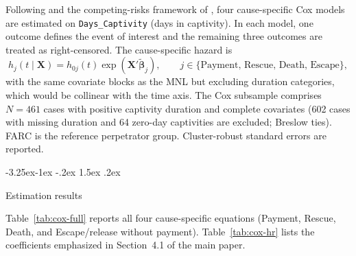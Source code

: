 \documentclass[12pt]{article}
\makeatletter
\numberwithin{equation}{section}
\numberwithin{table}{section}
\renewcommand\subsection{\@startsection{subsection}{2}{\z@}%
                                     {-3.25ex\@plus -1ex \@minus -.2ex}%
                                     {1.5ex \@plus .2ex}%
                                     {\normalfont\large\bfseries\raggedright}}
\makeatother
\begin{document}
Following \citet{Cox1972} and the competing-risks framework of
\citet{Bradburn2003}, four cause-specific Cox models are estimated on
\texttt{Days\_Captivity} (days in captivity). In each model, one outcome
defines the event of interest and the remaining three outcomes are treated
as right-censored. The cause-specific hazard is
\begin{equation}
h_j(t \mid \mathbf{X}) = h_{0j}(t)\exp\!\left(\mathbf{X}'\tilde{\boldsymbol{\beta}}_j\right),
\qquad j\in\{\text{Payment, Rescue, Death, Escape}\},
\label{eq:cox-app}
\end{equation}
with the same covariate blocks as the MNL but excluding duration categories,
which would be collinear with the time axis. The Cox subsample comprises
$N=461$ cases with positive captivity duration and complete covariates (602
cases with missing duration and 64 zero-day captivities are excluded; Breslow
ties). FARC is the reference perpetrator group. Cluster-robust standard
errors are reported.

\subsection{Estimation results}

Table~\ref{tab:cox-full} reports all four cause-specific equations (Payment,
Rescue, Death, and Escape/release without payment). Table~\ref{tab:cox-hr}
lists the coefficients emphasized in Section~4.1 of the main paper.


\end{document}
